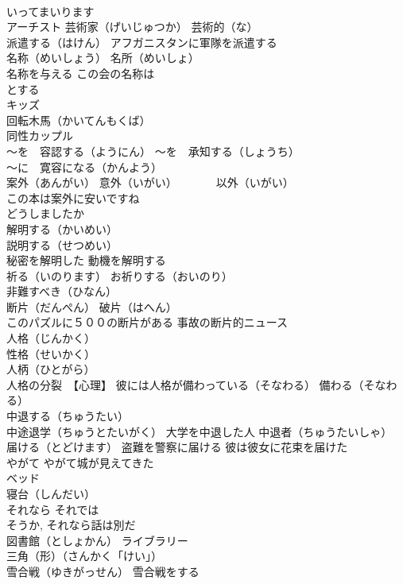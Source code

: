 \documentclass[8pt]{extreport}
\begin{document}
\begin{CJK}{UTF8}{min}
\\	いってまいります
\\	アーチスト 芸術家（げいじゅつか） 芸術的（な）
\\	派遣する（はけん） アフガニスタンに軍隊を派遣する
\\	名称（めいしょう） 名所（めいしょ）
\\	名称を与える この会の名称は
\\	とする
\\	キッズ
\\	回転木馬（かいてんもくば）
\\	同性カップル
\\	～を　容認する（ようにん） ～を　承知する（しょうち）
\\	～に　寛容になる（かんよう）
\\	案外（あんがい） 意外（いがい）　　　　以外（いがい）
\\	この本は案外に安いですね
\\	どうしましたか
\\	解明する（かいめい）
\\	説明する（せつめい）
\\	秘密を解明した 動機を解明する
\\	祈る（いのります） お祈りする（おいのり）
\\	非難すべき（ひなん）
\\	断片（だんぺん） 破片（はへん）
\\	このパズルに５００の断片がある 事故の断片的ニュース
\\	人格（じんかく）
\\	性格（せいかく）
\\	人柄（ひとがら）
\\	人格の分裂　【心理】 彼には人格が備わっている（そなわる） 備わる（そなわる）
\\	中退する（ちゅうたい） 
\\	中途退学（ちゅうとたいがく） 大学を中退した人 中退者（ちゅうたいしゃ）
\\	届ける（とどけます） 盗難を警察に届ける 彼は彼女に花束を届けた
\\	やがて やがて城が見えてきた
\\	ベッド 
\\	寝台（しんだい）
\\	それなら それでは 
\\	そうか, それなら話は別だ
\\	図書館（としょかん） ライブラリー
\\	三角（形）（さんかく「けい」）
\\	雪合戦（ゆきがっせん） 雪合戦をする

\end{CJK}
\end{document}
